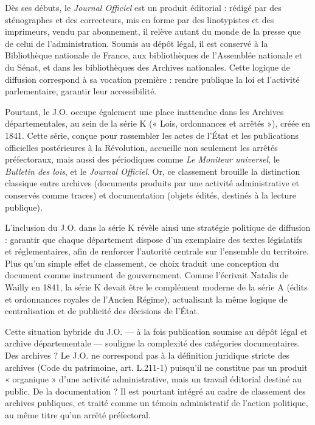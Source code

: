 Dès ses débuts, le \emph{Journal Officiel} est un produit éditorial : rédigé par des sténographes et des correcteurs, mis en forme par des linotypistes et des imprimeurs, vendu par abonnement, il relève autant du monde de la presse que de celui de l’administration. Soumis au dépôt légal, il est conservé à la Bibliothèque nationale de France, aux bibliothèques de l’Assemblée nationale et du Sénat, et dans les bibliothèques des Archives nationales. Cette logique de diffusion correspond à sa vocation première : rendre publique la loi et l’activité parlementaire, garantir leur accessibilité.

Pourtant, le J.O. occupe également une place inattendue dans les Archives départementales, au sein de la série K (« Lois, ordonnances et arrêtés »), créée en 1841. Cette série, conçue pour rassembler les actes de l’État et les publications officielles postérieures à la Révolution, accueille non seulement les arrêtés préfectoraux, mais aussi des périodiques comme \emph{Le Moniteur universel}, le \emph{Bulletin des lois}, et le \emph{Journal Officiel}. Or, ce classement brouille la distinction classique entre archives (documents produits par une activité administrative et conservés comme traces) et documentation (objets édités, destinés à la lecture publique).

L’inclusion du J.O. dans la série K révèle ainsi une stratégie politique de diffusion : garantir que chaque département dispose d’un exemplaire des textes législatifs et réglementaires, afin de renforcer l’autorité centrale sur l’ensemble du territoire. Plus qu’un simple effet de classement, ce choix traduit une conception du document comme instrument de gouvernement. Comme l’écrivait Natalis de Wailly en 1841, la série K devait être le complément moderne de la série A (édits et ordonnances royales de l’Ancien Régime), actualisant la même logique de centralisation et de publicité des décisions de l’État.

Cette situation hybride du J.O. — à la fois publication soumise au dépôt légal et archive départementale — souligne la complexité des catégories documentaires. Des archives ? Le J.O. ne correspond pas à la définition juridique stricte des archives (Code du patrimoine, art. L.211-1) puisqu’il ne constitue pas un produit « organique » d’une activité administrative, mais un travail éditorial destiné au public. De la documentation ? Il est pourtant intégré au cadre de classement des archives publiques, et traité comme un témoin administratif de l’action politique, au même titre qu’un arrêté préfectoral.

